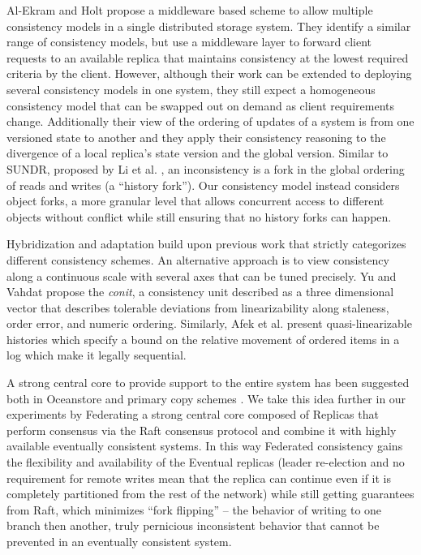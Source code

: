 Al-Ekram and Holt \cite{al-ekram_multi-consistency_2010} propose a middleware
based scheme to allow multiple consistency models in a single distributed
storage system.
They identify a similar range of consistency models, but use a middleware
layer to forward client requests to an available replica that maintains
consistency at the lowest required criteria by the client.
However, although their work can be extended to deploying several consistency
models in one system, they still expect a homogeneous consistency model that
can be swapped out on demand as client requirements change.
Additionally their view of the ordering of updates of a system is from one
versioned state to another and they apply their consistency reasoning to the
divergence of a local replica's state version and the global version.
Similar to SUNDR, proposed by Li et al.
\cite{li_secure_2004}, an inconsistency is a fork in the global ordering of
reads and writes (a ``history fork'').
Our consistency model instead considers object forks, a more granular level
that allows concurrent access to different objects without conflict while
still ensuring that no history forks can happen.

Hybridization and adaptation build upon previous work that strictly
categorizes different consistency schemes.
An alternative approach is to view consistency along a continuous scale with
several axes that can be tuned precisely.
Yu and Vahdat \cite{yu_design_2002} propose the \textit{conit}, a consistency
unit described as a three dimensional vector that describes tolerable
deviations from linearizability along staleness, order error, and numeric
ordering.
Similarly, Afek et al.
\cite{afek_quasi-linearizability:_2010} present quasi-linearizable histories
which specify a bound on the relative movement of ordered items in a log which
make it legally sequential.

A strong central core to provide support to the entire system has been
suggested both in Oceanstore \cite{kubiatowicz_oceanstore:_2000} and primary
copy schemes \cite{gray_dangers_1996}.
We take this idea further in our experiments by Federating a strong central
core composed of Replicas that perform consensus via the Raft consensus
protocol and combine it with highly available eventually consistent systems.
In this way Federated consistency gains the flexibility and availability of
the Eventual replicas (leader re-election and no requirement for remote writes
mean that the replica can continue even if it is completely partitioned from
the rest of the network) while still getting guarantees from Raft, which
minimizes ``fork flipping'' -- the behavior of writing to one branch then
another, truly pernicious inconsistent behavior that cannot be prevented in an
eventually consistent system.

